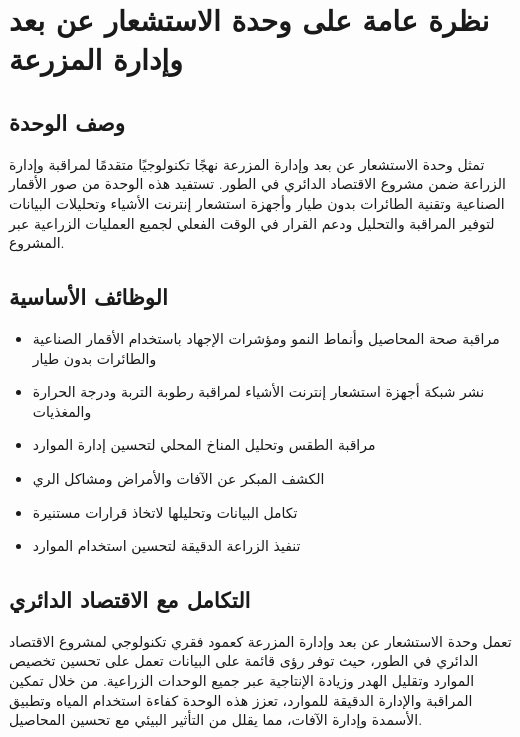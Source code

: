 \section{نظرة عامة على وحدة الاستشعار عن بعد وإدارة المزرعة}

\subsection{وصف الوحدة}
تمثل وحدة الاستشعار عن بعد وإدارة المزرعة نهجًا تكنولوجيًا متقدمًا لمراقبة وإدارة الزراعة ضمن مشروع الاقتصاد الدائري في الطور. تستفيد هذه الوحدة من صور الأقمار الصناعية وتقنية الطائرات بدون طيار وأجهزة استشعار إنترنت الأشياء وتحليلات البيانات لتوفير المراقبة والتحليل ودعم القرار في الوقت الفعلي لجميع العمليات الزراعية عبر المشروع.

\subsection{الوظائف الأساسية}
\begin{itemize}
    \item مراقبة صحة المحاصيل وأنماط النمو ومؤشرات الإجهاد باستخدام الأقمار الصناعية والطائرات بدون طيار
    \item نشر شبكة أجهزة استشعار إنترنت الأشياء لمراقبة رطوبة التربة ودرجة الحرارة والمغذيات
    \item مراقبة الطقس وتحليل المناخ المحلي لتحسين إدارة الموارد
    \item الكشف المبكر عن الآفات والأمراض ومشاكل الري
    \item تكامل البيانات وتحليلها لاتخاذ قرارات مستنيرة
    \item تنفيذ الزراعة الدقيقة لتحسين استخدام الموارد
\end{itemize}

\subsection{التكامل مع الاقتصاد الدائري}
تعمل وحدة الاستشعار عن بعد وإدارة المزرعة كعمود فقري تكنولوجي لمشروع الاقتصاد الدائري في الطور، حيث توفر رؤى قائمة على البيانات تعمل على تحسين تخصيص الموارد وتقليل الهدر وزيادة الإنتاجية عبر جميع الوحدات الزراعية. من خلال تمكين المراقبة والإدارة الدقيقة للموارد، تعزز هذه الوحدة كفاءة استخدام المياه وتطبيق الأسمدة وإدارة الآفات، مما يقلل من التأثير البيئي مع تحسين المحاصيل.

